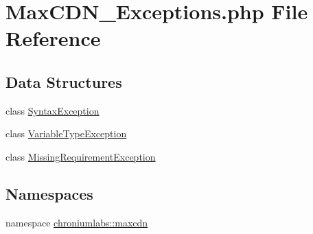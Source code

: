 \hypertarget{_max_c_d_n___exceptions_8php}{
\section{MaxCDN\_\-Exceptions.php File Reference}
\label{_max_c_d_n___exceptions_8php}
}
\subsection*{Data Structures}
\begin{DoxyCompactItemize}
\item 
class \hyperlink{class_syntax_exception}{SyntaxException}
\item 
class \hyperlink{class_variable_type_exception}{VariableTypeException}
\item 
class \hyperlink{class_missing_requirement_exception}{MissingRequirementException}
\end{DoxyCompactItemize}
\subsection*{Namespaces}
\begin{DoxyCompactItemize}
\item 
namespace \hyperlink{namespacechroniumlabs_1_1maxcdn}{chroniumlabs::maxcdn}
\end{DoxyCompactItemize}
